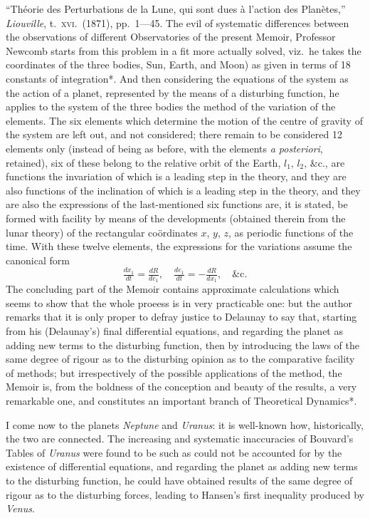 \documentclass[11pt]{article}
\begin{document}
\medskip
\noindent``Th\'eorie des Perturbations de la Lune, qui sont dues \`a l'action des Plan\`etes,''
\textit{Liouville}, t.~\textsc{xvi}.\ (1871), pp.~1---45. The evil of systematic differences between the observations of different Observatories
of the present Memoir, Professor Newcomb starts from this problem in
a fit more actually solved, viz.\ he takes the coordinates of the three bodies, Sun, Earth,
and Moon) as given in terms of 18 constants of integration*. And
then considering the equations of the system as the action of a planet, represented by
the means of a disturbing function, he applies to the system of the three bodies the
method of the variation of the elements. The six elements which determine the motion
of the centre of gravity of the system are left out, and not considered; there remain
to be considered 12 elements only (instead of being as before, with the elements
\textit{a posteriori}, retained), six of these belong to the relative orbit of the Earth, $l_1,\,l_2,\,\&\text{c.}$, are
functions the invariation of which is a leading step in the theory, and they are also
functions of the inclination of which is a leading step in the theory, and they are also
the expressions of the last-mentioned six functions are, it is stated, be formed with facility
by means of the developments (obtained therein from the lunar theory) of the rectangular
co\"ordinates $x$, $y$, $z$, as periodic functions of the time. With these twelve elements, the
expressions for the variations assume the canonical form
\[
\tfrac{dx_1}{dt}=\tfrac{dR}{de_1},\quad \tfrac{de_1}{dt}=-\tfrac{dR}{dx_1},\quad \&\text{c.}
\]
The concluding part of the Memoir contains approximate calculations which seems
to show that the whole proeess is in very practicable one: but the author remarks that
it is only proper to defray justice to Delaunay to say that, starting from his (Delaunay's) final
differential equations, and regarding the planet as adding new terms to the disturbing
function, then by introducing the laws of the same degree of rigour as to the disturbing
opinion as to the comparative facility of methods; but irrespectively of the possible
applications of the method, the Memoir is, from the boldness of the conception and
beauty of the results, a very remarkable one, and constitutes an important branch of
Theoretical Dynamics*.

I come now to the planets \textit{Neptune} and \textit{Uranus}: it is well-known how, historically,
the two are connected. The increasing and systematic inaccuracies of Bouvard's Tables
of \textit{Uranus} were found to be such as could not be accounted for by the existence of
differential equations, and regarding the planet as adding new terms to the disturbing
function, he could have obtained results of the same degree of rigour as to the disturbing
forces, leading to Hansen's first inequality produced by \textit{Venus}.
\end{document}
